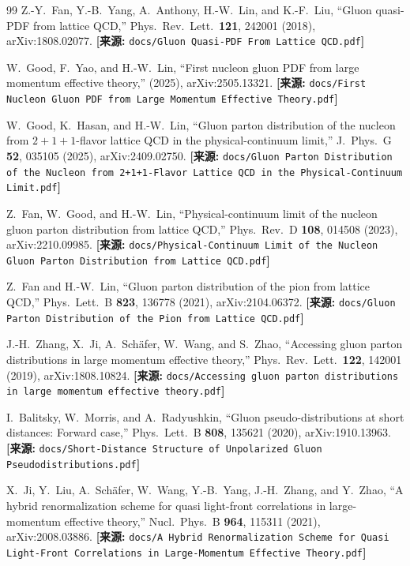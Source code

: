 \documentclass[12pt,a4paper]{ctexart}
\theoremstyle{definition}
\begin{document}
\begin{thebibliography}{99}
Z.-Y.~Fan, Y.-B.~Yang, A.~Anthony, H.-W.~Lin, and K.-F.~Liu,
``Gluon quasi-PDF from lattice QCD,''
Phys.\ Rev.\ Lett.\ \textbf{121}, 242001 (2018), arXiv:1808.02077.
\quad\textbf{[来源:} \texttt{docs/Gluon Quasi-PDF From Lattice QCD.pdf}\textbf{]}

W.~Good, F.~Yao, and H.-W.~Lin,
``First nucleon gluon PDF from large momentum effective theory,''
(2025), arXiv:2505.13321.
\quad\textbf{[来源:} \texttt{docs/First Nucleon Gluon PDF from Large Momentum Effective Theory.pdf}\textbf{]}

W.~Good, K.~Hasan, and H.-W.~Lin,
``Gluon parton distribution of the nucleon from $2+1+1$-flavor lattice QCD in the physical-continuum limit,''
J.\ Phys.\ G \textbf{52}, 035105 (2025), arXiv:2409.02750.
\quad\textbf{[来源:} \texttt{docs/Gluon Parton Distribution of the Nucleon from 2+1+1-Flavor Lattice QCD in the Physical-Continuum Limit.pdf}\textbf{]}

Z.~Fan, W.~Good, and H.-W.~Lin,
``Physical-continuum limit of the nucleon gluon parton distribution from lattice QCD,''
Phys.\ Rev.\ D \textbf{108}, 014508 (2023), arXiv:2210.09985.
\quad\textbf{[来源:} \texttt{docs/Physical-Continuum Limit of the Nucleon Gluon Parton Distribution from Lattice QCD.pdf}\textbf{]}

Z.~Fan and H.-W.~Lin,
``Gluon parton distribution of the pion from lattice QCD,''
Phys.\ Lett.\ B \textbf{823}, 136778 (2021), arXiv:2104.06372.
\quad\textbf{[来源:} \texttt{docs/Gluon Parton Distribution of the Pion from Lattice QCD.pdf}\textbf{]}

J.-H.~Zhang, X.~Ji, A.~Sch\"afer, W.~Wang, and S.~Zhao,
``Accessing gluon parton distributions in large momentum effective theory,''
Phys.\ Rev.\ Lett.\ \textbf{122}, 142001 (2019), arXiv:1808.10824.
\quad\textbf{[来源:} \texttt{docs/Accessing gluon parton distributions in large momentum effective theory.pdf}\textbf{]}

I.~Balitsky, W.~Morris, and A.~Radyushkin,
``Gluon pseudo-distributions at short distances: Forward case,''
Phys.\ Lett.\ B \textbf{808}, 135621 (2020), arXiv:1910.13963.
\quad\textbf{[来源:} \texttt{docs/Short-Distance Structure of Unpolarized Gluon Pseudodistributions.pdf}\textbf{]}

X.~Ji, Y.~Liu, A.~Sch\"afer, W.~Wang, Y.-B.~Yang, J.-H.~Zhang, and Y.~Zhao,
``A hybrid renormalization scheme for quasi light-front correlations in large-momentum effective theory,''
Nucl.\ Phys.\ B \textbf{964}, 115311 (2021), arXiv:2008.03886.
\quad\textbf{[来源:} \texttt{docs/A Hybrid Renormalization Scheme for Quasi Light-Front Correlations in Large-Momentum Effective Theory.pdf}\textbf{]}


\end{thebibliography}
\end{document}
